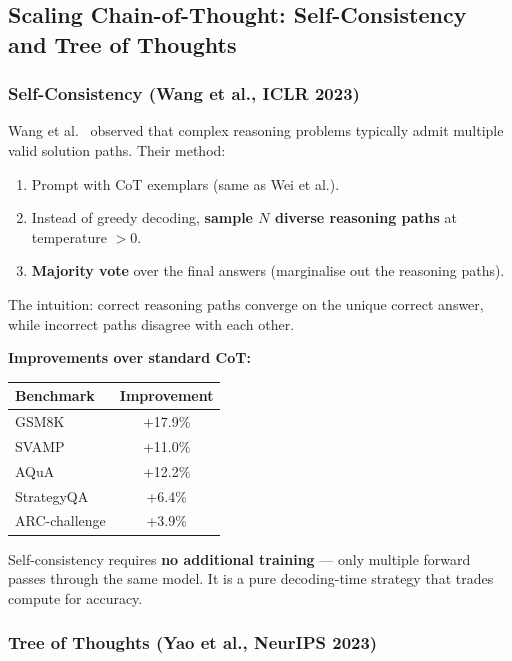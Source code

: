 \documentclass[11pt, a4paper]{article}
\theoremstyle{definition}
\theoremstyle{plain}
\begin{document}
\subsection{Scaling Chain-of-Thought: Self-Consistency and Tree of Thoughts}
\label{subsec:cot-scaling}

\subsubsection{Self-Consistency (Wang et al., ICLR 2023)}

Wang et al.~\cite{wang2023selfconsistency} observed that complex reasoning problems typically admit multiple valid solution paths. Their method:

\begin{enumerate}
  \item Prompt with CoT exemplars (same as Wei et al.).
  \item Instead of greedy decoding, \textbf{sample $N$ diverse reasoning paths} at temperature $> 0$.
  \item \textbf{Majority vote} over the final answers (marginalise out the reasoning paths).
\end{enumerate}

The intuition: correct reasoning paths converge on the unique correct answer, while incorrect paths disagree with each other.

\textbf{Improvements over standard CoT:}
\begin{center}
\begin{tabular}{lc}
  \toprule
  \textbf{Benchmark} & \textbf{Improvement} \\
  \midrule
  GSM8K & +17.9\% \\
  SVAMP & +11.0\% \\
  AQuA & +12.2\% \\
  StrategyQA & +6.4\% \\
  ARC-challenge & +3.9\% \\
  \bottomrule
\end{tabular}
\end{center}

Self-consistency requires \textbf{no additional training} --- only multiple forward passes through the same model. It is a pure decoding-time strategy that trades compute for accuracy.

\subsubsection{Tree of Thoughts (Yao et al., NeurIPS 2023)}
\end{document}
